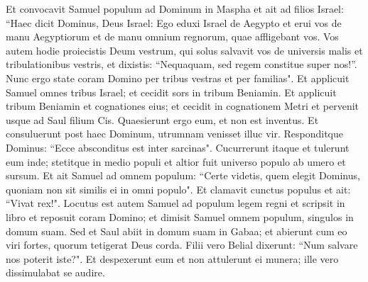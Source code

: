 \begin{biblechapter}
\verse Et convocavit Samuel populum ad Dominum in Maspha 
\verse et ait ad filios Israel: “Haec dicit Dominus, Deus Israel: Ego eduxi Israel de Aegypto et erui vos de manu Aegyptiorum et de manu omnium regnorum, quae affligebant vos. 
\verse Vos autem hodie proiecistis Deum vestrum, qui solus salvavit vos de universis malis et tribulationibus vestris, et dixistis: “Nequaquam, sed regem constitue super nos!”. Nunc ergo state coram Domino per tribus vestras et per familias". 
\verse Et applicuit Samuel omnes tribus Israel; et cecidit sors in tribum Beniamin. 
\verse Et applicuit tribum Beniamin et cognationes eius; et cecidit in cognationem Metri et pervenit usque ad Saul filium Cis. Quaesierunt ergo eum, et non est inventus. 
\verse Et consuluerunt post haec Dominum, utrumnam venisset illuc vir. Responditque Dominus: “Ecce absconditus est inter sarcinas". 
\verse Cucurrerunt itaque et tulerunt eum inde; stetitque in medio populi et altior fuit universo populo ab umero et sursum. 
\verse Et ait Samuel ad omnem populum: “Certe videtis, quem elegit Dominus, quoniam non sit similis ei in omni populo". Et clamavit cunctus populus et ait: “Vivat rex!". 
\verse Locutus est autem Samuel ad populum legem regni et scripsit in libro et reposuit coram Domino; et dimisit Samuel omnem populum, singulos in domum suam. 
\verse Sed et Saul abiit in domum suam in Gabaa; et abierunt cum eo viri fortes, quorum tetigerat Deus corda. 
\verse Filii vero Belial dixerunt: “Num salvare nos poterit iste?". Et despexerunt eum et non attulerunt ei munera; ille vero dissimulabat se audire. 
\end{biblechapter}

